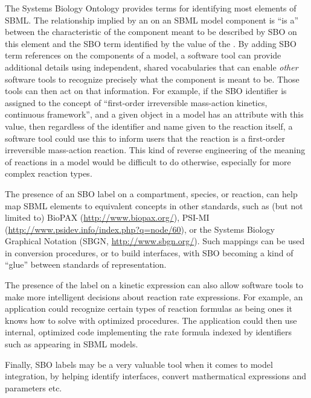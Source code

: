 The Systems Biology Ontology provides terms for
identifying most elements of SBML. The relationship implied by an  on an SBML model component is ``is a'' between the characteristic of the component meant to be described by SBO on this element and the SBO term identified by the value of the . By adding SBO term
references on the components of a model, a software tool can
provide additional details using independent, shared vocabularies
that can enable \emph{other} software tools to recognize precisely
what the component is meant to be.  Those tools can then act on
that information.  For example, if the SBO identifier
 is assigned to the concept of ``first-order
irreversible mass-action kinetics, continuous framework'', and a
given \KineticLaw object in a model has an 
attribute with this value, then regardless of the
identifier and name given to the reaction itself, a software tool
could use this to inform users that the reaction is a first-order
irreversible mass-action reaction.  This kind of reverse
engineering of the meaning of reactions in a model would be
difficult to do otherwise, especially for more complex reaction
types.

The presence of an SBO label on a compartment, species, or
reaction, can help map SBML elements to equivalent concepts in
other standards, such as (but not limited to) BioPAX
(\url{http://www.biopax.org/}), PSI-{MI (\url{http://www.psidev.info/index.php?q=node/60})}, or the Systems Biology Graphical
Notation (SBGN, \url{http://www.sbgn.org/}).  Such mappings can be
used in conversion procedures, or to build interfaces, with SBO
becoming a kind of ``glue'' between standards of representation.

The presence of the label on a kinetic expression can also allow
software tools to make more intelligent decisions about reaction
rate expressions.  For example, an application could recognize
certain types of reaction formulas as being ones it
knows how to solve with optimized procedures.  The application
could then use internal, optimized code implementing the rate
formula indexed by identifiers such as 
appearing in SBML models.

Finally, SBO labels may be a very valuable tool when it comes to model integration, by helping identify interfaces, convert mathermatical expressions and parameters etc. 

